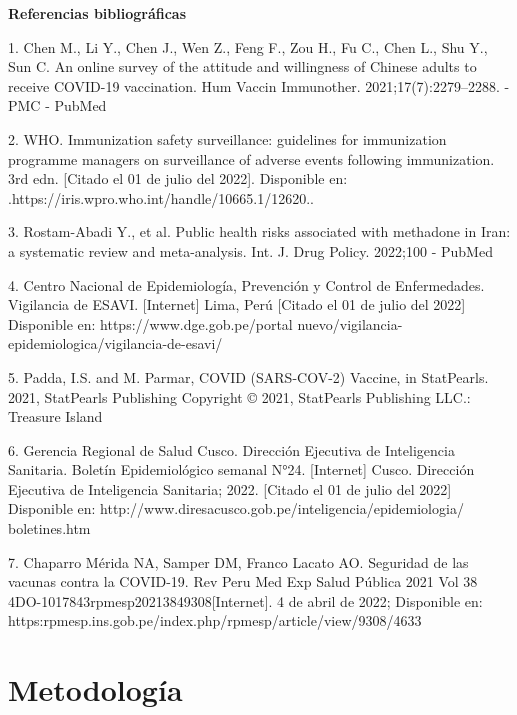\documentclass[12pt,a4paper,openany]{book}
\begin{document}
 
\textbf{Referencias bibliográficas}

1.	Chen M., Li Y., Chen J., Wen Z., Feng F., Zou H., Fu C., Chen L., Shu Y., Sun C. An online survey of the attitude and willingness of Chinese adults to receive COVID-19 vaccination. Hum Vaccin Immunother. 2021;17(7):2279–2288. - PMC - PubMed

2.	WHO. Immunization safety surveillance: guidelines for immunization programme managers on surveillance of adverse events following immunization. 3rd edn. [Citado el 01 de julio del 2022]. Disponible en: .https://iris.wpro.who.int/handle/10665.1/12620..

3.	Rostam-Abadi Y., et al. Public health risks associated with methadone in Iran: a systematic review and meta-analysis. Int. J. Drug Policy. 2022;100 - PubMed

4.	Centro Nacional de Epidemiología, Prevención y Control de Enfermedades. Vigilancia de ESAVI. [Internet] Lima, Perú [Citado el 01 de julio del 2022] Disponible en: https://www.dge.gob.pe/portal
nuevo/vigilancia-epidemiologica/vigilancia-de-esavi/

5.	Padda, I.S. and M. Parmar, COVID (SARS-COV-2) Vaccine, in StatPearls. 2021, StatPearls Publishing Copyright © 2021, StatPearls Publishing LLC.: Treasure Island 

6.	Gerencia Regional de Salud Cusco. Dirección Ejecutiva de Inteligencia Sanitaria. Boletín Epidemiológico semanal N°24. [Internet]  Cusco. Dirección Ejecutiva de Inteligencia Sanitaria; 2022. [Citado el 01 de julio del 2022] Disponible en:   http://www.diresacusco.gob.pe/inteligencia/epidemiologia/
boletines.htm

7.	Chaparro Mérida NA, Samper DM, Franco Lacato AO. Seguridad de las vacunas contra la COVID-19. Rev Peru Med Exp Salud Pública 2021 Vol 38 4DO-1017843rpmesp20213849308[Internet]. 4 de abril de 2022; Disponible en: https:rpmesp.ins.gob.pe/index.php/rpmesp/article/view/9308/4633

	

	
		
	
	\clearpage	
	\section*{Metodología}
	
\end{document}
